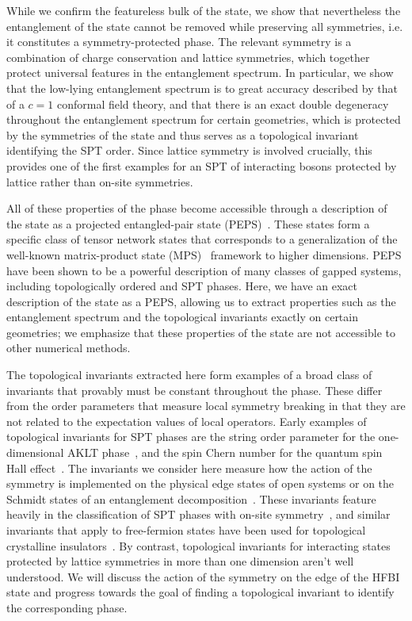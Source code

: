 While we confirm the featureless bulk of the state, we show that nevertheless the entanglement of the state cannot be removed while preserving
all symmetries, i.e. it constitutes a symmetry-protected phase. The relevant symmetry is a combination of charge
conservation and lattice symmetries, which together protect universal features in the entanglement spectrum. In
particular, we show that the low-lying entanglement spectrum is to great accuracy described by that of a $c=1$
conformal field theory, and that there is an exact double 
degeneracy throughout the entanglement spectrum for certain geometries, which is protected
by the symmetries of the state and thus serves as a topological invariant identifying the SPT order.
Since lattice symmetry is involved crucially, this provides one of the first examples for an SPT of interacting bosons
protected by lattice rather than on-site symmetries.

All of these properties of the phase become accessible through a description of the state
as a projected entangled-pair state (PEPS)~\cite{verstraete2004}. These states form a specific class of tensor
network states that corresponds to a generalization of the well-known matrix-product state
(MPS)~\cite{white1992,ostlund1996,schollwoeck2010}
framework to higher dimensions. PEPS have been shown to be a powerful description of many
classes of gapped systems, including topologically ordered and SPT phases. Here, we have an
exact description of the state as a PEPS, allowing us to extract properties such as the entanglement
spectrum and the topological invariants exactly on certain geometries; we emphasize that these
properties of the state are not accessible to other numerical methods.

The topological invariants extracted here form examples of a broad class
of invariants that provably must be constant throughout the phase. These differ
from the order parameters that measure local symmetry breaking in that they
are not related to the expectation values of local operators. Early examples
of topological invariants for SPT phases are the string order parameter for the one-dimensional
AKLT phase~\cite{...}, and the spin Chern number for the quantum spin Hall effect~\cite{...}.
The invariants we consider here measure how the action of the symmetry is implemented on the 
physical edge states of open systems or on the Schmidt states of an 
entanglement decomposition~\cite{pollmann,...}. These invariants feature heavily in the 
classification of SPT phases with on-site symmetry~\cite{...}, and similar invariants 
that apply to free-fermion states have been used for topological crystalline 
insulators~\cite{bernevig...}. By contrast, topological invariants for interacting states 
protected by lattice symmetries in more than one dimension aren't well 
understood. We will discuss the action of the symmetry on the edge of the HFBI 
state and progress towards the goal of finding a topological invariant to 
identify the corresponding phase.
